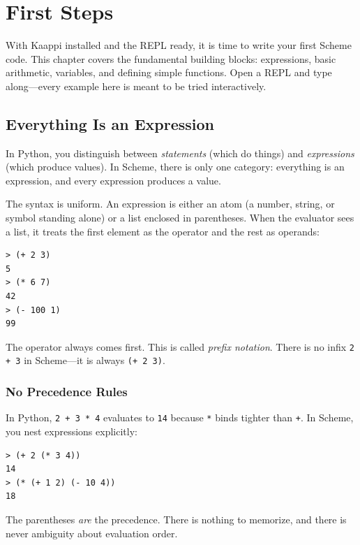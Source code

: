 \chapter{First Steps}
\label{ch:first-steps}

With Kaappi installed and the REPL ready, it is time to write your first Scheme code. This chapter covers the fundamental building blocks: expressions, basic arithmetic, variables, and defining simple functions. Open a REPL and type along---every example here is meant to be tried interactively.

\section{Everything Is an Expression}

In Python, you distinguish between \emph{statements} (which do things) and \emph{expressions} (which produce values). In Scheme, there is only one category: everything is an expression, and every expression produces a value.

The syntax is uniform. An expression is either an atom (a number, string, or symbol standing alone) or a list enclosed in parentheses. When the evaluator sees a list, it treats the first element as the operator and the rest as operands:

\begin{lstlisting}[style=repl]
> (+ 2 3)
5
> (* 6 7)
42
> (- 100 1)
99
\end{lstlisting}

The operator always comes first. This is called \emph{prefix notation}. There is no infix \texttt{2 + 3} in Scheme---it is always \texttt{(+ 2 3)}.

\subsection{No Precedence Rules}

In Python, \texttt{2 + 3 * 4} evaluates to \texttt{14} because \texttt{*} binds tighter than \texttt{+}. In Scheme, you nest expressions explicitly:

\begin{lstlisting}[style=repl]
> (+ 2 (* 3 4))
14
> (* (+ 1 2) (- 10 4))
18
\end{lstlisting}

The parentheses \emph{are} the precedence. There is nothing to memorize, and there is never ambiguity about evaluation order.

